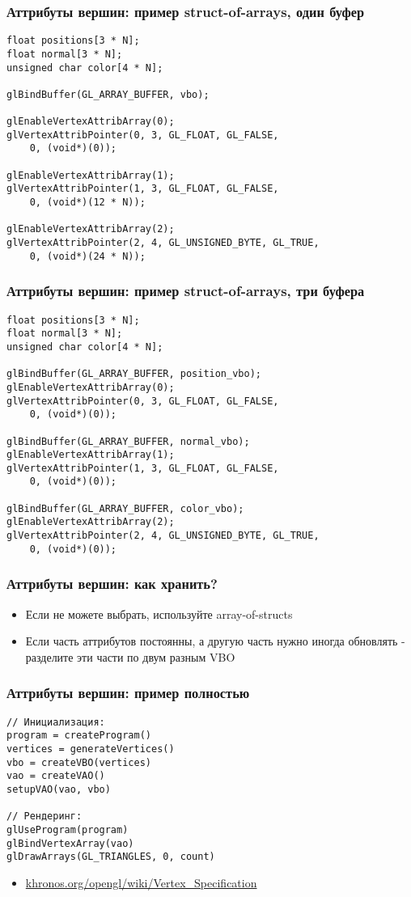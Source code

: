 \documentclass{beamer}
\begin{document}
\begin{frame}[fragile]
\frametitle{Аттрибуты вершин: пример struct-of-arrays, один буфер}
\fontsize{10pt}{10pt}
\begin{verbatim}
float positions[3 * N];
float normal[3 * N];
unsigned char color[4 * N];

glBindBuffer(GL_ARRAY_BUFFER, vbo);

glEnableVertexAttribArray(0);
glVertexAttribPointer(0, 3, GL_FLOAT, GL_FALSE,
    0, (void*)(0));

glEnableVertexAttribArray(1);
glVertexAttribPointer(1, 3, GL_FLOAT, GL_FALSE,
    0, (void*)(12 * N));
    
glEnableVertexAttribArray(2);
glVertexAttribPointer(2, 4, GL_UNSIGNED_BYTE, GL_TRUE,
    0, (void*)(24 * N));
\end{verbatim}
\end{frame}

\begin{frame}[fragile]
\frametitle{Аттрибуты вершин: пример struct-of-arrays, три буфера}
\fontsize{10pt}{10pt}
\begin{verbatim}
float positions[3 * N];
float normal[3 * N];
unsigned char color[4 * N];

glBindBuffer(GL_ARRAY_BUFFER, position_vbo);
glEnableVertexAttribArray(0);
glVertexAttribPointer(0, 3, GL_FLOAT, GL_FALSE,
    0, (void*)(0));

glBindBuffer(GL_ARRAY_BUFFER, normal_vbo);
glEnableVertexAttribArray(1);
glVertexAttribPointer(1, 3, GL_FLOAT, GL_FALSE,
    0, (void*)(0));

glBindBuffer(GL_ARRAY_BUFFER, color_vbo);
glEnableVertexAttribArray(2);
glVertexAttribPointer(2, 4, GL_UNSIGNED_BYTE, GL_TRUE,
    0, (void*)(0));
\end{verbatim}
\end{frame}

\begin{frame}[fragile]
\frametitle{Аттрибуты вершин: как хранить?}
\begin{itemize}
\item Если не можете выбрать, используйте array-of-structs
\pause
\item Если часть аттрибутов постоянны, а другую часть нужно иногда обновлять - разделите эти части по двум разным VBO
\end{itemize}
\end{frame}

\begin{frame}[fragile]
\frametitle{Аттрибуты вершин: пример полностью}
\begin{verbatim}
// Инициализация:
program = createProgram()
vertices = generateVertices()
vbo = createVBO(vertices)
vao = createVAO()
setupVAO(vao, vbo)

// Рендеринг:
glUseProgram(program)
glBindVertexArray(vao)
glDrawArrays(GL_TRIANGLES, 0, count)
\end{verbatim}
\pause
\begin{itemize}
\item \href{https://www.khronos.org/opengl/wiki/Vertex_Specification}{khronos.org/opengl/wiki/Vertex\_Specification}
\end{itemize}
\end{frame}
\end{document}
